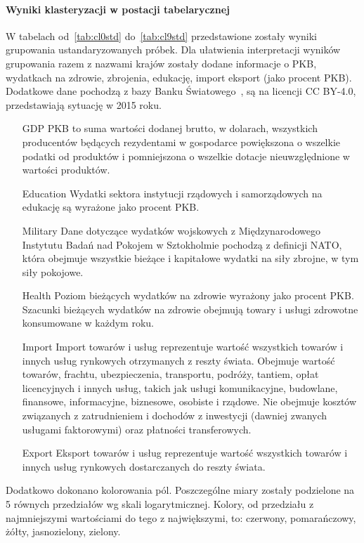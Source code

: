 \documentclass[11pt]{report}
\begin{document}
    \paragraph{Wyniki klasteryzacji w postacji tabelarycznej}
    W tabelach od~\ref{tab:cl0std} do~\ref{tab:cl9std} przedstawione zostały wyniki grupowania ustandaryzowanych próbek.
    Dla ułatwienia interpretacji wyników grupowania razem z nazwami krajów zostały dodane informacje o PKB, wydatkach na zdrowie, zbrojenia, edukację, import eksport (jako procent PKB).
    Dodatkowe dane pochodzą z bazy Banku Światowego~\cite{worldbank}, są na licencji CC BY-4.0, przedstawiają sytuację w 2015 roku.
    \begin{enumerate}
        \item[GDP] PKB to suma wartości dodanej brutto, w dolarach, wszystkich producentów będących rezydentami w gospodarce powiększona o wszelkie podatki od produktów i pomniejszona o wszelkie dotacje nieuwzględnione w wartości produktów.
        \item[Education] Wydatki sektora instytucji rządowych i samorządowych na edukację są wyrażone jako procent PKB.
        \item[Military] Dane dotyczące wydatków wojskowych z Międzynarodowego Instytutu Badań nad Pokojem w Sztokholmie pochodzą z definicji NATO, która obejmuje wszystkie bieżące i kapitałowe wydatki na siły zbrojne, w tym siły pokojowe.
        \item[Health] Poziom bieżących wydatków na zdrowie wyrażony jako procent PKB. Szacunki bieżących wydatków na zdrowie obejmują towary i usługi zdrowotne konsumowane w każdym roku.
        \item[Import] Import towarów i usług reprezentuje wartość wszystkich towarów i innych usług rynkowych otrzymanych z reszty świata.
        Obejmuje wartość towarów, frachtu, ubezpieczenia, transportu, podróży, tantiem, opłat licencyjnych i innych usług, takich jak usługi komunikacyjne, budowlane, finansowe, informacyjne, biznesowe, osobiste i rządowe.
        Nie obejmuje kosztów związanych z zatrudnieniem i dochodów z inwestycji (dawniej zwanych usługami faktorowymi) oraz płatności transferowych.
        \item[Export] Eksport towarów i usług reprezentuje wartość wszystkich towarów i innych usług rynkowych dostarczanych do reszty świata.
    \end{enumerate}
    Dodatkowo dokonano kolorowania pól.
    Poszczególne miary zostały podzielone na 5 równych przedziałów wg skali logarytmicznej.
    Kolory, od przedziału z najmniejszymi wartościami do tego z największymi, to: czerwony, pomarańczowy, żółty, jasnozielony, zielony.
\end{document}
